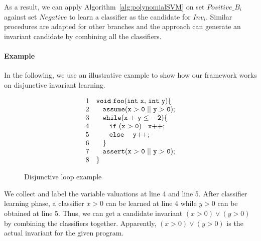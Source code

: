 As a result, we can apply Algorithm~\ref{alg:polynomialSVM} on set $\mathit{Positive\_B_i}$ against set $\mathit{Negative}$ to learn a classifier as the candidate for $Inv_i$.
Similar procedures are adapted for other branches and the approach can generate an invariant candidate by combining all the classifiers.

\paragraph{Example}
In the following, we use an illustrative example to show how our framework works on disjunctive invariant learning. 

\begin{figure}%
    \raggedright
     \vspace{-0.2cm} \[
      \begin{array}{ll}
      1 & \code{void~foo(int ~x{,} ~int~y)\{} \\
      2 & \code{~~~ assume(x~{>}~0~ {||} ~y~{>}~0);}  \\
      3 & \code{~~~ while(x~{+}~y~{\le}-2)\{}  \\
      4 & \code{~~~ \quad if~(x~{>}~0) ~~~x{++};}  \\
      5 & \code{~~~ \quad else~ ~~~y{++};}\\
      6 & \code{~~~\}} \\
      7 & \code{~~~assert(x~{>}~0~ {||} ~y~{>}~0);}\\
      8 & \}
      \end{array}
    \]
\caption{Disjunctive loop example}
\label{fig:disjunctive:example}
\end{figure}
We collect and label the variable valuations at line 4 and line 5.
After classifier learning phase, a classifier $x>0$ can be learned at line 4 while $y>0$ can be obtained at line 5.
Thus, we can get a candidate invariant $(x>0) \vee (y>0)$ by combining the classifiers together.
Apparently, $(x>0) \vee (y>0)$ is the actual invariant for the given program.

